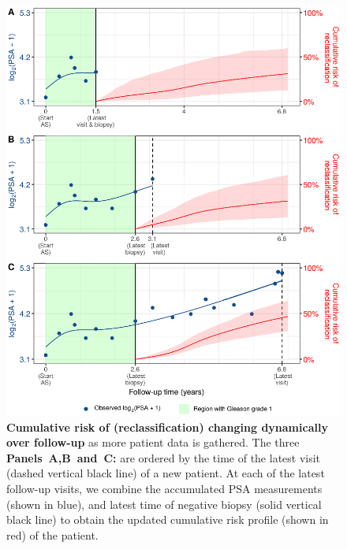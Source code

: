 \begin{figure}
\centerline{\includegraphics[width=\columnwidth]{images/dynrisk_plot_102.eps}}
\caption{\textbf{Cumulative risk of (reclassification) changing dynamically over follow-up} as more patient data is gathered. The three \textbf{Panels~A,B~and~C:} are ordered by the time of the latest visit (dashed vertical black line) of a new patient. At each of the latest follow-up visits, we combine the accumulated PSA measurements (shown in blue), and latest time of negative biopsy (solid vertical black line) to obtain the updated cumulative risk profile (shown in red) of the patient.}
\label{fig:dynrisk_plot_102}
\end{figure}

\clearpage
